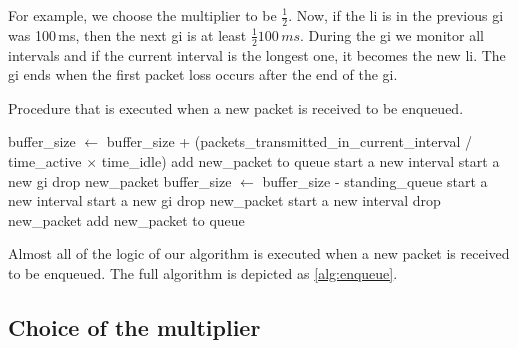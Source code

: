 \documentclass[10pt,sigconf,letterpaper,dvipsnames\ifx\removeHeaders\tempYes ,nonacm\fi\ifx\removeHeaders\tempNo ,anonymous\fi]{acmart}
\begin{document}
For example, we choose the multiplier to be $\frac{1}{2}$. Now, if the \gls{li} is in the previous \gls{gi} was 100\,ms, then the next \gls{gi} is at least $\frac{1}{2} 100\,ms$. During the \gls{gi} we monitor all intervals and if the current interval is the longest one, it becomes the new \gls{li}. The \gls{gi} ends when the first packet loss occurs after the end of the \gls{gi}. 

\begin{algorithm}[h]
\caption{Procedure that is executed when a new packet is received to be enqueued.}
\label{alg:enqueue}
\begin{algorithmic}[1]%
			\State buffer\_size $\gets$ buffer\_size + (packets\_transmitted\_in\_current\_interval / time\_active $\times$ time\_idle)
			\State add new\_packet to queue
			\State start a new interval
			\State start a new \gls{gi}
			\State drop new\_packet
				\State buffer\_size $\gets$ buffer\_size - standing\_queue
			\EndIf
			\State start a new interval
			\State start a new \gls{gi}
			\State drop new\_packet
		\Else
			\State start a new interval
			\State drop new\_packet
		\EndIf
	\Else
		\State add new\_packet to queue
	\EndIf
\EndFunction
\end{algorithmic}
\end{algorithm}
Almost all of the logic of our algorithm is executed when a new packet is received to be enqueued. The full algorithm is depicted as \autoref{alg:enqueue}.

\subsection{Choice of the multiplier}
\end{document}

